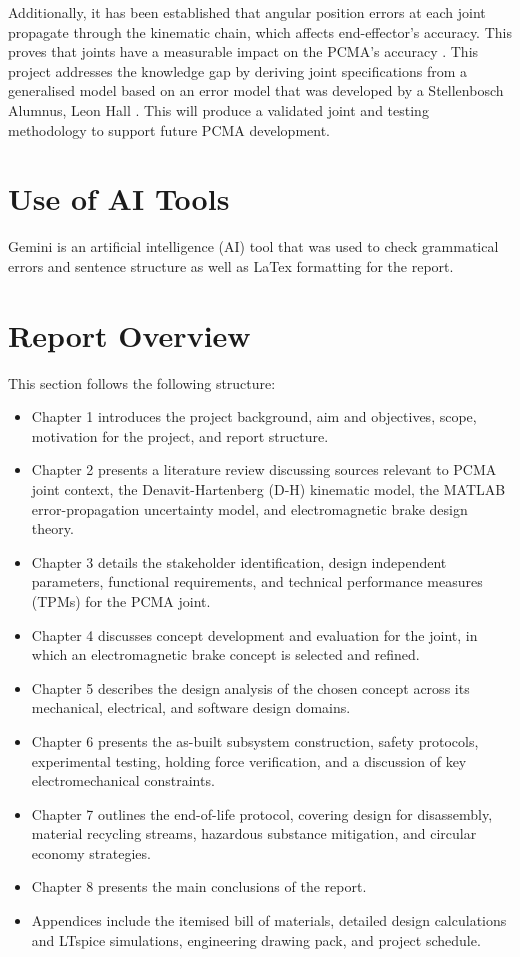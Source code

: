 Additionally, it has been established that angular position errors at each joint propagate through the kinematic chain, which affects end-effector's accuracy. This proves that joints have a measurable impact on the PCMA's accuracy \citep{Meagher:2016}. This project addresses the knowledge gap by deriving joint specifications from a generalised model based on an error model that was developed by a Stellenbosch Alumnus, Leon Hall \citep{Hall:2010}. This will produce a validated joint and testing methodology to support future PCMA development.

\section{Use of AI Tools}

Gemini is an artificial intelligence (AI) tool that was used to check grammatical errors and sentence structure as well as LaTex formatting for the report.

\section{Report Overview}

This section follows the following structure:
\begin{itemize}
	\item Chapter 1 introduces the project background, aim and objectives, scope, motivation for the project, and report structure.
	\item Chapter 2 presents a literature review discussing sources relevant to PCMA joint context, the Denavit-Hartenberg (D-H) kinematic model, the MATLAB error-propagation uncertainty model, and electromagnetic brake design theory.
	\item Chapter 3 details the stakeholder identification, design independent parameters, functional requirements, and technical performance measures (TPMs) for the PCMA joint.
	\item Chapter 4 discusses concept development and evaluation for the joint, in which an electromagnetic brake concept is selected and refined.
	\item Chapter 5 describes the design analysis of the chosen concept across its mechanical, electrical, and software design domains.
	\item Chapter 6 presents the as-built subsystem construction, safety protocols, experimental testing, holding force verification, and a discussion of key electromechanical constraints.
	\item Chapter 7 outlines the end-of-life protocol, covering design for disassembly, material recycling streams, hazardous substance mitigation, and circular economy strategies.
	\item Chapter 8 presents the main conclusions of the report.
	\item Appendices include the itemised bill of materials, detailed design calculations and LTspice simulations, engineering drawing pack, and project schedule.
\end{itemize}


